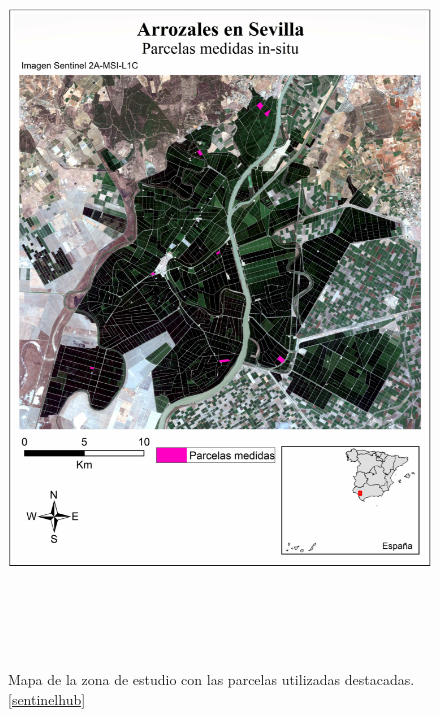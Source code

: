 \begin{figure}[H]
    \centering
    \includegraphics[height=20cm]{archivos/tfg/parcel_sat} %
    \caption{Mapa de la zona de estudio con las parcelas utilizadas destacadas. \ref{sentinelhub} }
    \label{fig:parcel}
\end{figure}
